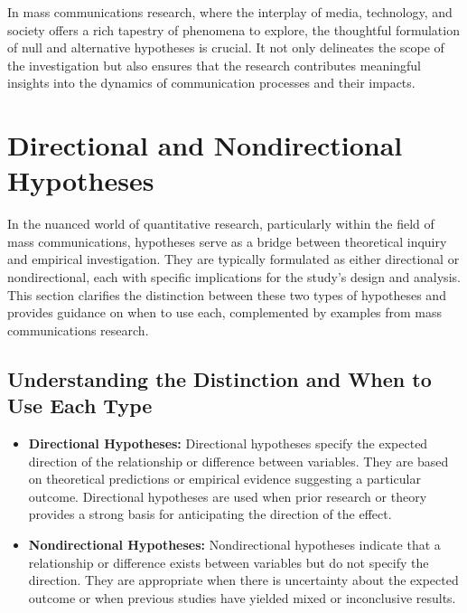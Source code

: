 \documentclass[
]{book}
\begin{document}
In mass communications research, where the interplay of media, technology, and society offers a rich tapestry of phenomena to explore, the thoughtful formulation of null and alternative hypotheses is crucial. It not only delineates the scope of the investigation but also ensures that the research contributes meaningful insights into the dynamics of communication processes and their impacts.

\hypertarget{directional-and-nondirectional-hypotheses}{%
\section{Directional and Nondirectional Hypotheses}\label{directional-and-nondirectional-hypotheses}}

In the nuanced world of quantitative research, particularly within the field of mass communications, hypotheses serve as a bridge between theoretical inquiry and empirical investigation. They are typically formulated as either directional or nondirectional, each with specific implications for the study's design and analysis. This section clarifies the distinction between these two types of hypotheses and provides guidance on when to use each, complemented by examples from mass communications research.

\hypertarget{understanding-the-distinction-and-when-to-use-each-type}{%
\subsection*{Understanding the Distinction and When to Use Each Type}\label{understanding-the-distinction-and-when-to-use-each-type}}

\begin{itemize}
\item
  \textbf{Directional Hypotheses:} Directional hypotheses specify the expected direction of the relationship or difference between variables. They are based on theoretical predictions or empirical evidence suggesting a particular outcome. Directional hypotheses are used when prior research or theory provides a strong basis for anticipating the direction of the effect.
\item
  \textbf{Nondirectional Hypotheses:} Nondirectional hypotheses indicate that a relationship or difference exists between variables but do not specify the direction. They are appropriate when there is uncertainty about the expected outcome or when previous studies have yielded mixed or inconclusive results.
\end{itemize}
\end{document}
